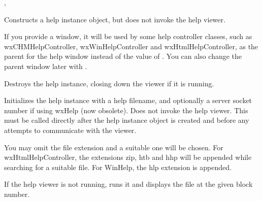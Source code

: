 
, 


\label{wxhelpcontrollerctor}


Constructs a help instance object, but does not invoke the help viewer.

If you provide a window, it will be used by some help controller classes, such as
wxCHMHelpController, wxWinHelpController and wxHtmlHelpController, as the
parent for the help window instead of the value of . You can also change the parent window later with 
.

\label{wxhelpcontrollerdtor}


Destroys the help instance, closing down the viewer if it is running.

\label{wxhelpcontrollerinitialize}



Initializes the help instance with a help filename, and optionally a server socket
number if using wxHelp (now obsolete). Does not invoke the help viewer.
This must be called directly after the help instance object is created and before
any attempts to communicate with the viewer.

You may omit the file extension and a suitable one will be chosen. For
wxHtmlHelpController, the extensions zip, htb and hhp will be appended while searching for
a suitable file. For WinHelp, the hlp extension is appended.

\label{wxhelpcontrollerdisplayblock}


If the help viewer is not running, runs it and displays the file at the given block number.

